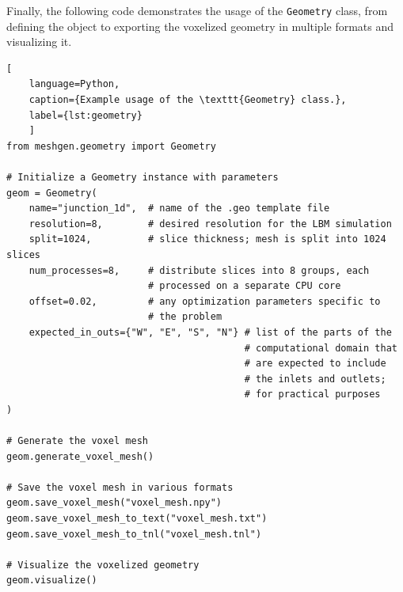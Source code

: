 Finally, the following code demonstrates the usage of the \texttt{Geometry} class, from defining the object to exporting the voxelized geometry in multiple formats and visualizing it.

\begin{lstlisting}[
	language=Python,
	caption={Example usage of the \texttt{Geometry} class.},
	label={lst:geometry}
	]
from meshgen.geometry import Geometry
	
# Initialize a Geometry instance with parameters
geom = Geometry(
	name="junction_1d",  # name of the .geo template file
	resolution=8,        # desired resolution for the LBM simulation
	split=1024,          # slice thickness; mesh is split into 1024 slices
	num_processes=8,     # distribute slices into 8 groups, each
						 # processed on a separate CPU core
	offset=0.02,		 # any optimization parameters specific to
						 # the problem
	expected_in_outs={"W", "E", "S", "N"} # list of the parts of the
										  # computational domain that
										  # are expected to include 
										  # the inlets and outlets;
										  # for practical purposes
)
	
# Generate the voxel mesh
geom.generate_voxel_mesh()

# Save the voxel mesh in various formats
geom.save_voxel_mesh("voxel_mesh.npy")
geom.save_voxel_mesh_to_text("voxel_mesh.txt")
geom.save_voxel_mesh_to_tnl("voxel_mesh.tnl")

# Visualize the voxelized geometry
geom.visualize()
\end{lstlisting}
